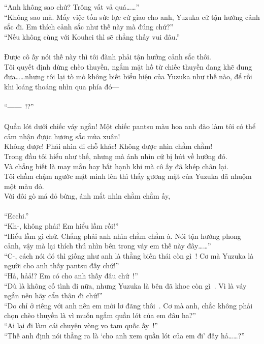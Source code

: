 \documentclass[12pt,a4paper, twosides]{book}
\begin{document}
“Anh không sao chứ? Trông vất vả quá……”\\
“Không sao mà. Mấy việc tốn sức lực cứ giao cho anh, Yuzuka cứ tận hưởng cảnh sắc đi. Em thích cảnh sắc như thế này mà đúng chứ?”\\
“Nếu không cùng với Kouhei thì sẽ chẳng thấy vui đâu.”\\
\\
Được cô ấy nói thế này thì tôi đành phải tận hưởng cảnh sắc thôi.\\
Tôi quyết định dừng chèo thuyền, ngắm mặt hồ từ chiếc thuyền đang khẽ đung đưa……nhưng tôi lại tò mò không biết biểu hiện của Yuzuka như thế nào, để rồi khi loáng thoáng nhìn qua phía đó—\\
\\
“——~!?”\\
\\
Quần lót dưới chiếc váy ngắn! Một chiếc pantsu màu hoa anh đào làm tôi có thể cảm nhận được hương sắc mùa xuân!\\
Không được! Phải nhìn đi chỗ khác! Không được nhìn chằm chằm!\\
Trong đầu tôi hiểu như thế, nhưng mà ánh nhìn cứ bị hút về hướng đó.\\
Và chẳng biết là may mắn hay bất hạnh khi mà cô ấy đã khép chân lại.\\
Tôi chầm chậm ngước mặt mình lên thì thấy gương mặt của Yuzuka đã nhuộm một màu đỏ.\\
Với đôi gò má đỏ bừng, ánh mắt nhìn chằm chằm ấy, \\
\\
“Ecchi.”\\
“Kh-, không phải! Em hiểu lầm rồi!”\\
“Hiểu lầm gì chứ. Chẳng phải anh nhìn chằm chằm à. Nói tận hưởng phong cảnh, vậy mà lại thích thú nhìn bên trong váy em thế này đây……”\\
“C-, cách nói đó thì giống như anh là thằng biến thái còn gì~! Cơ mà Yuzuka là người cho anh thấy pantsu đấy chứ!”\\
“Hả, hảả!? Em có cho anh thấy đâu chứ~!”\\
“Dù là không cố tình đi nữa, nhưng Yuzuka là bên đã khoe còn gì~. Vì là váy ngắn nên hãy cẩn thận đi chứ!”\\
“Do chỉ ở riêng với anh nên em mới lơ đãng thôi~. Cơ mà anh, chắc không phải chọn chèo thuyền là vì muốn ngắm quần lót của em đâu ha?”\\
“Ai lại đi làm cái chuyện vòng vo tam quốc ấy~!”\\
“Thế anh định nói thẳng ra là ‘cho anh xem quần lót của em đi’ đấy hả……?”\\
\end{document}
